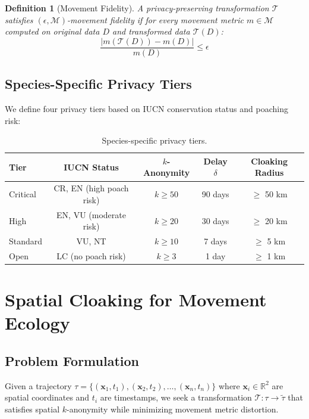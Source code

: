 \documentclass[11pt,letterpaper]{article}
\newtheorem{definition}{Definition}[section]
\begin{document}
\begin{definition}[Movement Fidelity]
A privacy-preserving transformation $\mathcal{T}$ satisfies $(\epsilon, \mathcal{M})$-movement fidelity if for every movement metric $m \in \mathcal{M}$ computed on original data $D$ and transformed data $\mathcal{T}(D)$:
\begin{equation}
\frac{|m(\mathcal{T}(D)) - m(D)|}{m(D)} \leq \epsilon
\end{equation}
\end{definition}

\subsection{Species-Specific Privacy Tiers}

We define four privacy tiers based on IUCN conservation status and poaching risk:

\begin{table}[htbp]
\centering
\caption{Species-specific privacy tiers.}
\label{tab:tiers}
\begin{tabular}{lcccc}
\toprule
\textbf{Tier} & \textbf{IUCN Status} & $k$\textbf{-Anonymity} & \textbf{Delay} $\delta$ & \textbf{Cloaking Radius} \\
\midrule
Critical & CR, EN (high poach risk) & $k \geq 50$ & 90 days & $\geq$ 50 km \\
High & EN, VU (moderate risk) & $k \geq 20$ & 30 days & $\geq$ 20 km \\
Standard & VU, NT & $k \geq 10$ & 7 days & $\geq$ 5 km \\
Open & LC (no poach risk) & $k \geq 3$ & 1 day & $\geq$ 1 km \\
\bottomrule
\end{tabular}
\end{table}

\section{Spatial Cloaking for Movement Ecology}

\subsection{Problem Formulation}

Given a trajectory $\tau = \{(\mathbf{x}_1, t_1), (\mathbf{x}_2, t_2), \ldots, (\mathbf{x}_n, t_n)\}$ where $\mathbf{x}_i \in \mathbb{R}^2$ are spatial coordinates and $t_i$ are timestamps, we seek a transformation $\mathcal{T}: \tau \to \tilde{\tau}$ that satisfies spatial $k$-anonymity while minimizing movement metric distortion.
\end{document}
